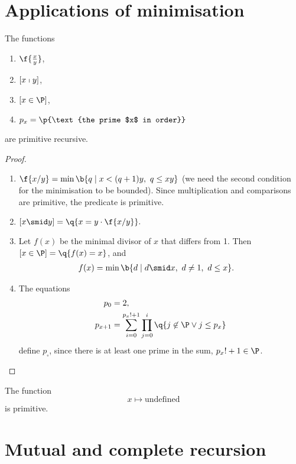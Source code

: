 \section{Applications of minimisation}

\begin{lemma}
  The functions
  \begin{enumerate}
    \item $\f{\frac{x}{y}}$,
    \item $[x \shortmid y]$,
    \item $[x \in \P]$,
    \item $p_x = \p{\text{the prime $x$ in order}}$
  \end{enumerate}
  are primitive recursive.
\end{lemma}

\begin{proof}
  ~\begin{enumerate}
    \item $\f{x/y} = \min \b{ q \mid x < (q+1)y,\ q \le xy }$ (we need the second condition for the minimisation to be bounded). Since multiplication and comparisons are primitive, the predicate is primitive.
    \item $[x \smid y] = \q{x=y\cdot\f{x/y}}.$
    \item Let $f(x)$ be the minimal divisor of $x$ that differs from 1. Then $[x \in \P] = \q{f(x) = x}$, and
    \begin{align*}
      f(x)
      &= \min \b{ d \mid d \smid x, \ d \ne 1, \ d \le x }.
    \end{align*}
    \item The equations
    \begin{align*}
      p_0 &= 2, \\
      p_{x+1} &= \sum_{i=0}^{p_x!+1} \prod_{j=0}^i \q{j \not \in \P \lor j \le p_x}
    \end{align*}
    define $p_\square$, since there is at least one prime in the sum, $p_x!+1 \in \P$.
  \end{enumerate}
\end{proof}

\begin{lemma}
  The function
  $$ x \mapsto \text{undefined} $$
  is primitive.
\end{lemma}

\section{Mutual and complete recursion}

